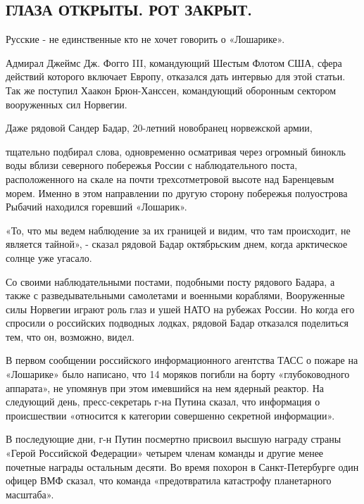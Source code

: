\hypertarget{ux433ux43bux430ux437ux430-ux43eux442ux43aux440ux44bux442ux44b-ux440ux43eux442-ux437ux430ux43aux440ux44bux442}{%
\subsection{ГЛАЗА ОТКРЫТЫ. РОТ
ЗАКРЫТ.}\label{ux433ux43bux430ux437ux430-ux43eux442ux43aux440ux44bux442ux44b-ux440ux43eux442-ux437ux430ux43aux440ux44bux442}}

Русские - не единственные кто не хочет говорить о «Лошарике».

Адмирал Джеймс Дж. Фогго III, командующий Шестым Флотом США, сфера
действий которого включает Европу, отказался дать интервью для этой
статьи. Так же поступил Хаакон Брюн-Ханссен, командующий оборонным
сектором вооруженных сил Норвегии.

Даже рядовой Сандер Бадар, 20-летний новобранец норвежской армии,

тщательно подбирал слова, одновременно осматривая через огромный бинокль
воды вблизи северного побережья России с наблюдательного поста,
расположенного на скале на почти трехсотметровой высоте над Баренцевым
морем. Именно в этом направлении по другую сторону побережья полуострова
Рыбачий находился горевший «Лошарик».

«То, что мы ведем наблюдение за их границей и видим, что там происходит,
не является тайной», - сказал рядовой Бадар октябрьским днем, когда
арктическое солнце уже угасало.

Со своими наблюдательными постами, подобными посту рядового Бадара, а
также с разведывательными самолетами и военными кораблями, Вооруженные
силы Норвегии играют роль глаз и ушей НАТО на рубежах России. Но когда
его спросили о российских подводных лодках, рядовой Бадар отказался
поделиться тем, что он, возможно, видел.

В первом сообщении российского информационного агентства ТАСС о пожаре
на «Лошарике» было написано, что 14 моряков погибли на борту
«глубоководного аппарата», не упомянув при этом имевшийся на нем ядерный
реактор. На следующий день, пресс-секретарь г-на Путина сказал, что
информация о происшествии «относится к категории совершенно секретной
информации».

В последующие дни, г-н Путин посмертно присвоил высшую награду страны
«Герой Российской Федерации» четырем членам команды и другие менее
почетные награды остальным десяти. Во время похорон в Санкт-Петербурге
один офицер ВМФ сказал, что команда «предотвратила катастрофу
планетарного масштаба».

